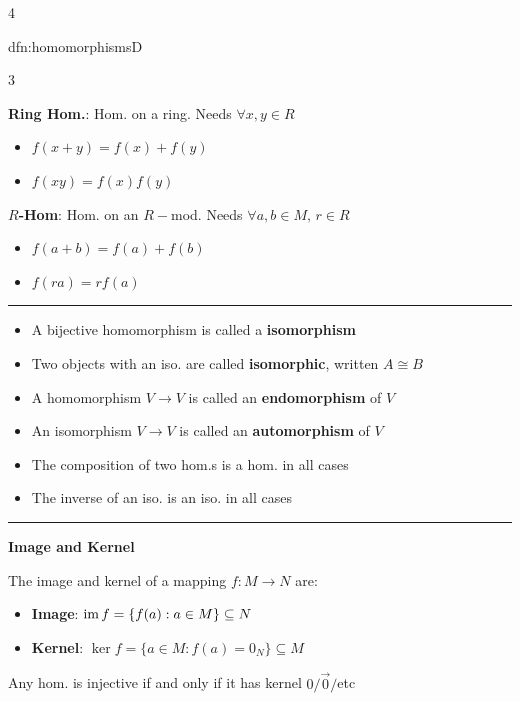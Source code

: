 \documentclass[landscape, 8pt]{extarticle}
\begin{document}
\begin{multicols*}{4}
\begin{mdfn}{dfn:homomorphisms}{D}
{\begin{multicols}{3}
				\columnbreak    
				
				\vspace*{-7ex}
				
				\textbf{Ring Hom.}: Hom. on a ring. Needs $\forall x, y\in R$
				\begin{itemize}[leftmargin=*]
					\item $f (x + y) = f(x) + f(y)$
					\item $f(xy) = f(x)f(y)$
				\end{itemize}
				
				\columnbreak
				
				\vspace*{-7ex}
				
				\textbf{$R$-Hom}: Hom. on an $R-$mod. Needs $\forall a, b\in M,\,r\in R$
				\begin{itemize}[leftmargin=*]
					\item $f(a + b) = f(a) + f(b)$
					\item $f(ra) = rf(a)$
				\end{itemize}
			\end{multicols}
		}
			\vspace*{-7ex}
			
			\noindent\rule{\textwidth}{0.2pt}
			
			
			\begin{itemize}[leftmargin=*]
				\setlength\itemsep{0em}
				\item A bijective homomorphism is called a \textbf{isomorphism}
				\item Two objects with an iso. are called \textbf{isomorphic}, written $A \cong B$
				\item A homomorphism $V\to V$ is called an \textbf{endomorphism} of $V$
				\item An isomorphism $V\to V$ is called an \textbf{automorphism} of $V$
				\item The composition of two hom.s is a hom. in all cases
				\item The inverse of an iso. is an iso. in all cases
			\end{itemize}
			
			\vspace*{-2ex}
			
			\noindent\rule{\textwidth}{0.2pt}
			
			\textbf{Image and Kernel}
			
			The image and kernel of a mapping $f : M \to N$ are:
			
			\begin{itemize}
			\setlength\itemsep{0em}
			\item \textbf{Image}: $\operatorname{im} f = \{f(a) : a\in M\}\subseteq N$
			\item \textbf{Kernel}: $\ker f = \{a\in M : f(a) = 0_{N}\} \subseteq M$
			\end{itemize}
			Any hom. is injective if and only if it has kernel $0/\vec{0}/$etc
			

\end{mdfn}
\end{multicols*}
\end{document}
